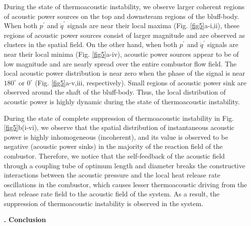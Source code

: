 \documentclass[twocolumn,10pt]{article} %
\renewcommand{\section}%
              [1]%
              {%
               \bgroup%
               \flushleft%
               \small\bf%
               \stepcounter{section}%
               \arabic{section}. #1%
               \par%
               \egroup%
              }%
\begin{document}
During the state of thermoacoustic instability, we observe larger coherent regions of  acoustic power sources on the top and downstream regions of the bluff-body. When both $p^\prime$ and $\dot{q}^\prime$ signals are near their local maxima (Fig. \ref{fig5}a-i,ii), these regions of acoustic power sources consist of larger magnitude and are observed as clusters in the spatial field. On the other hand, when both $p^\prime$ and $\dot{q}^\prime$ signals are near their local minima (Fig. \ref{fig5}a-iv), acoustic power sources appear to be of low magnitude and are nearly  spread over the entire combustor flow field. The local acoustic power distribution is near zero when the phase of the signal is near $180^\circ$ or $0^\circ$ (Fig. \ref{fig5}a-v,iii, respectively). Small regions of acoustic power sink are observed around the shaft of the bluff-body. Thus, the local distribution of acoustic power is highly dynamic during the state of thermoacoustic instability. 

During the state of complete suppression of thermoacoustic instability in Fig. \ref{fig5}b(i-vi), we observe that the spatial distribution of instantaneous acoustic power is highly inhomogeneous (incoherent), and its value is observed to be negative (acoustic power sinks) in the majority of the reaction field of the combustor. Therefore, we notice that the self-feedback of the acoustic field through a coupling tube of optimum length and diameter breaks the constructive interactions between the acoustic pressure and the local heat release rate oscillations in the combustor, which causes lesser thermoacoustic driving from the heat release rate field to the acoustic field of the system. As a result, the suppression of thermoacoustic instability is observed in the system.

\section{Conclusion} \addvspace{10pt}
\end{document}

